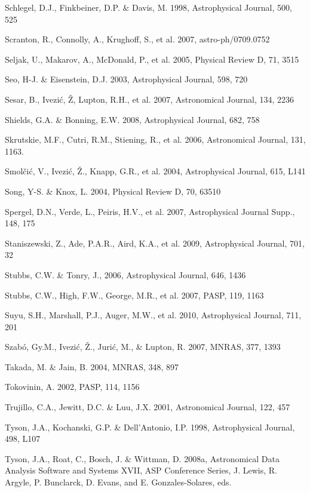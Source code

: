 \documentclass{emulateapj}
\begin{document}
\begin{thebibliography}{}
\bibitem[()]{} Schlegel, D.J., Finkbeiner, D.P. \& Davis, M. 1998, Astrophysical Journal, 500, 525

\bibitem[()]{} Scranton, R., Connolly, A., Krughoff, S., et al. 2007, astro-ph/0709.0752

\bibitem[()]{} Seljak, U., Makarov, A., McDonald, P., et al. 2005,  Physical Review D, 71, 3515

\bibitem[()]{} Seo, H-J. \& Eisenstein, D.J. 2003, Astrophysical Journal, 598, 720

\bibitem[()]{} Sesar, B., Ivezi\'{c}, \v{Z}, Lupton, R.H., et al. 2007, Astronomical Journal, 134, 2236

\bibitem[()]{} Shields, G.A. \& Bonning, E.W. 2008,  Astrophysical Journal, 682, 758 

\bibitem[()]{} Skrutskie, M.F., Cutri, R.M., Stiening, R., et al. 2006, Astronomical Journal, 131, 1163.

\bibitem[()]{} Smol{\v c}i{\'c}, V., Ivezi\'{c}, \v{Z.}, Knapp, G.R., et al. 2004, Astrophysical 
             Journal, 615, L141 

\bibitem[()]{} Song, Y-S. \& Knox, L. 2004, Physical Review D, 70, 63510

\bibitem[()]{} Spergel, D.N., Verde, L., Peiris, H.V., et al. 2007, Astrophysical Journal Supp., 148, 175

\bibitem[()]{} Staniszewski, Z., Ade, P.A.R., Aird, K.A., et al. 2009,  Astrophysical  Journal, 701, 32

\bibitem[()]{} Stubbs, C.W. \& Tonry, J., 2006, Astrophysical Journal, 646, 1436

\bibitem[()]{} Stubbs, C.W., High, F.W., George, M.R., et al. 2007, PASP, 119, 1163 

\bibitem[()]{} Suyu, S.H., Marshall, P.J., Auger, M.W., et al. 2010, Astrophysical Journal, 711, 201

\bibitem[()]{} Szab\'o, Gy.M., Ivezi\'c, \v{Z}., Juri\'c, M., \& Lupton, R. 2007, MNRAS, 377, 1393

\bibitem[()]{} Takada, M. \& Jain, B. 2004, MNRAS, 348, 897

\bibitem[()]{} Tokovinin, A. 2002, PASP, 114, 1156

\bibitem[()]{} Trujillo, C.A., Jewitt, D.C. \& Luu, J.X. 2001, Astronomical Journal, 122, 457
	
\bibitem[()]{} Tyson, J.A., Kochanski, G.P. \& Dell'Antonio, I.P. 1998, Astrophysical Journal, 498, L107

\bibitem[()]{} Tyson, J.A., Roat, C., Bosch, J. \& Wittman, D. 2008a, Astronomical 
             Data Analysis Software and Systems XVII, ASP Conference Series, 
             J. Lewis, R. Argyle, P. Bunclarck, D. Evans, and E. Gonzales-Solares, eds.     


\end{thebibliography}
\end{document}
